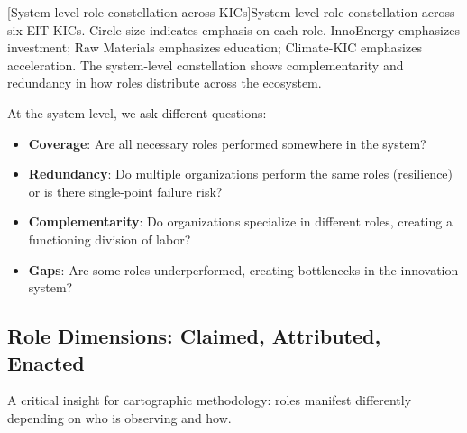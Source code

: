 \documentclass[../main.tex]{subfiles}
\begin{document}
\begin{center}
[System-level role constellation across KICs]{System-level role constellation across six EIT KICs. Circle size indicates emphasis on each role. InnoEnergy emphasizes investment; Raw Materials emphasizes education; Climate-KIC emphasizes acceleration. The system-level constellation shows complementarity and redundancy in how roles distribute across the ecosystem.}
\end{center}

At the system level, we ask different questions:
\begin{itemize}[leftmargin=*, itemsep=0.2em]
\item \textbf{Coverage}: Are all necessary roles performed somewhere in the system?
\item \textbf{Redundancy}: Do multiple organizations perform the same roles (resilience) or is there single-point failure risk?
\item \textbf{Complementarity}: Do organizations specialize in different roles, creating a functioning division of labor?
\item \textbf{Gaps}: Are some roles underperformed, creating bottlenecks in the innovation system?
\end{itemize}

\subsection{Role Dimensions: Claimed, Attributed, Enacted}

A critical insight for cartographic methodology: roles manifest differently depending on who is observing and how.
\end{document}

